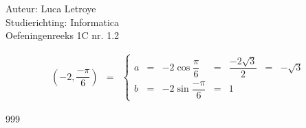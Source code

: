 \documentclass[a4paper]{article}
\begin{document}
  
\noindent \large Auteur: Luca Letroye \\
\noindent \large Studierichting: Informatica\\
\noindent \large Oefeningenreeks 1C nr. 1.2\\

\medskip

\normalsize
\begin{eqnarray*}
\left(-2,\dfrac{-\pi}{6}\right) &=&
\left\{
\begin{array}{cccccccc}
a & = & -2\cos \dfrac{\pi}{6} & = & \dfrac{-2\sqrt{3}}{2} & = & -\sqrt{3}\\
b & = & -2 \sin \dfrac{-\pi}{6} & = & 1
\end{array}
\right.
\end{eqnarray*}


\begin{thebibliography}{999}
\end{thebibliography}
\end{document}
